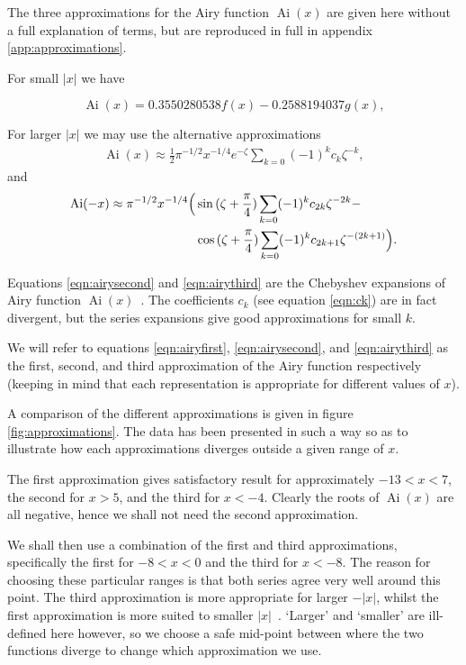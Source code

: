 \documentclass[]{article}
\renewcommand{\mod}[1]{\ensuremath{\lvert {#1} \rvert}}
\newcommand{\Ai}[1]{\ensuremath{\operatorname{Ai}({#1})}}
\begin{document}
The three approximations for the Airy function $\Ai{x}$ are given here without a full explanation of terms, but are reproduced in full in appendix \ref{app:approximations}.

For small $\mod{x}$ we have~\cite{ref:abramowitz}

\begin{equation}\label{eqn:airyfirst}
\Ai{x} = 0.3550280538f(x) - 0.2588194037g(x),
\end{equation}

For larger $\mod{x}$ we may use the alternative approximations
\begin{align}\label{eqn:airysecond}
\Ai{x} \approx \frac{1}{2}\pi^{-1/2}x^{-1/4}e^{-\zeta} \sum\limits_{k=0} (-1)^{k}c_{k}\zeta^{-k},
\end{align}
and
\begin{equation}\label{eqn:airythird}
	\begin{split}
		\Ai{-x} \approx \pi^{-1/2}x^{-1/4}
		\Bigl(
			&\sin{(\zeta + \frac{\pi}{4})}\sum\limits_{k=0}(-1)^{k}c_{2k}\zeta^{-2k} -\\
			&\cos{(\zeta + \frac{\pi}{4})}\sum\limits_{k=0}(-1)^{k}c_{2k+1}\zeta^{-(2k+1)}
		\Bigr).
	\end{split}
\end{equation}

Equations \ref{eqn:airysecond} and \ref{eqn:airythird} are the Chebyshev expansions of Airy function $\Ai{x}$~\cite{ref:agil}. The coefficients $c_{k}$ (see equation \ref{eqn:ck}) are in fact divergent, but the series expansions give good approximations for small $k$.

We will refer to equations \ref{eqn:airyfirst}, \ref{eqn:airysecond}, and \ref{eqn:airythird} as the first, second, and third approximation of the Airy function respectively (keeping in mind that each representation is appropriate for different values of $x$).

A comparison of the different approximations is given in figure \ref{fig:approximations}. The data has been presented in such a way so as to illustrate how each approximations diverges outside a given range of $x$.

The first approximation gives satisfactory result for approximately $-13 < x < 7$, the second for $x > 5$, and the third for $x < -4$. Clearly the roots of \Ai{x} are all negative, hence we shall not need the second approximation.

We shall then use a combination of the first and third approximations, specifically the first for $-8 < x < 0$ and the third for $x < -8$. The reason for choosing these particular ranges is that both series agree very well around this point. The third approximation is more appropriate for larger $-\mod{x}$, whilst the first approximation is more suited to smaller $\mod{x}$~\cite{ref:gdaniell}. `Larger' and `smaller' are ill-defined here however, so we choose a safe mid-point between where the two functions diverge to change which approximation we use.
\end{document}
